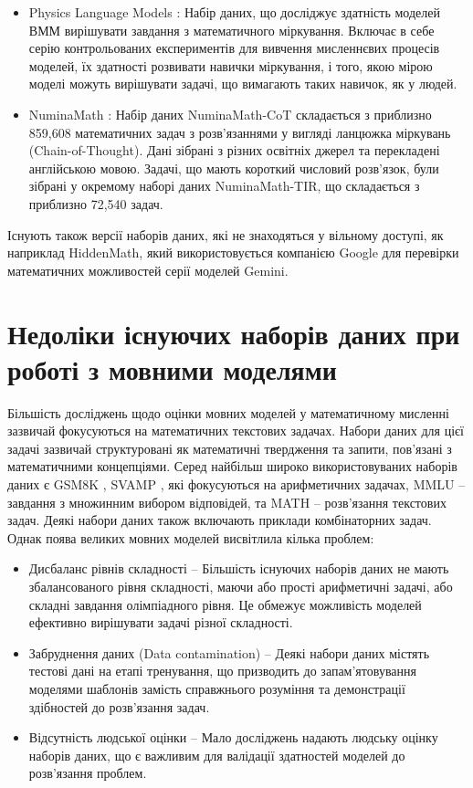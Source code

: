 \begin{itemize}
    \item {Physics Language Models} \cite{ye2024physicslanguagemodels21}: Набір даних, що досліджує здатність моделей ВММ вирішувати завдання з математичного міркування. Включає в себе серію контрольованих експериментів для вивчення мисленнєвих процесів моделей, їх здатності розвивати навички міркування, і того, якою мірою моделі можуть вирішувати задачі, що вимагають таких навичок, як у людей.

    \item {NuminaMath} \cite{numina_math_7b}: Набір даних NuminaMath-CoT складається з приблизно 859,608 математичних задач з розв'язаннями у вигляді ланцюжка міркувань (Chain-of-Thought). Дані зібрані з різних освітніх джерел та перекладені англійською мовою. Задачі, що мають короткий числовий розв'язок, були зібрані у окремому наборі даних NuminaMath-TIR, що складається з приблизно 72,540 задач.

\end{itemize}

Існують також версії наборів даних, які не знаходяться у вільному доступі, як наприклад {HiddenMath}, який використовується компанією Google для перевірки математичних можливостей серії моделей Gemini.

\section{Недоліки існуючих наборів даних при роботі з мовними моделями}

Більшість досліджень щодо оцінки мовних моделей у математичному мисленні зазвичай фокусуються на математичних текстових задачах. Набори даних для цієї задачі зазвичай структуровані як математичні твердження та запити, пов'язані з математичними концепціями. Серед найбільш широко використовуваних наборів даних є GSM8K \cite{cobbe2021trainingverifierssolvemath}, SVAMP \cite{patel2021nlpmodelsreallyable}, які фокусуються на арифметичних задачах, MMLU \cite{hendrycks2021measuringmassivemultitasklanguage} -- завдання з множинним вибором відповідей, та MATH \cite{hendrycks2021measuringmathematicalproblemsolving} -- розв'язання текстових задач. Деякі набори даних також включають приклади комбінаторних задач. Однак поява великих мовних моделей висвітлила кілька проблем:

\begin{itemize}
    \item {Дисбаланс рівнів складності} -- Більшість існуючих наборів даних не мають збалансованого рівня складності, маючи або прості арифметичні задачі, або складні завдання олімпіадного рівня. Це обмежує можливість моделей ефективно вирішувати задачі різної складності.
    \item {Забруднення даних} (Data contamination) -- Деякі набори даних містять тестові дані на етапі тренування, що призводить до запам'ятовування моделями шаблонів замість справжнього розуміння та демонстрації здібностей до розв'язання задач.
    \item {Відсутність людської оцінки} -- Мало досліджень надають людську оцінку наборів даних, що є важливим для валідації здатностей моделей до розв'язання проблем.
\end{itemize}

